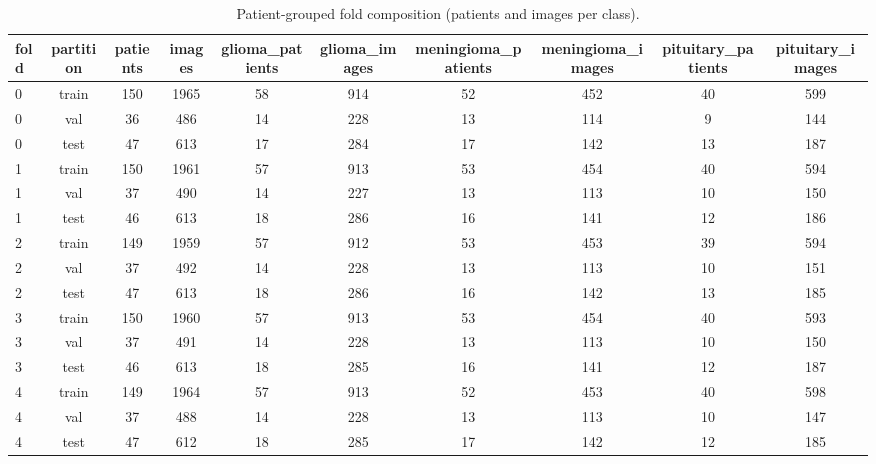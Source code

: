 \begin{table}[t]
\centering
\caption{Patient-grouped fold composition (patients and images per class).}
\label{tab:table1_split_composition}
\small
\begin{tabular}{lccccccccc}
\toprule
fold & partition & patients & images & glioma\_patients & glioma\_images & meningioma\_patients & meningioma\_images & pituitary\_patients & pituitary\_images \\
\midrule
0 & train & 150 & 1965 & 58 & 914 & 52 & 452 & 40 & 599 \\
0 & val & 36 & 486 & 14 & 228 & 13 & 114 & 9 & 144 \\
0 & test & 47 & 613 & 17 & 284 & 17 & 142 & 13 & 187 \\
1 & train & 150 & 1961 & 57 & 913 & 53 & 454 & 40 & 594 \\
1 & val & 37 & 490 & 14 & 227 & 13 & 113 & 10 & 150 \\
1 & test & 46 & 613 & 18 & 286 & 16 & 141 & 12 & 186 \\
2 & train & 149 & 1959 & 57 & 912 & 53 & 453 & 39 & 594 \\
2 & val & 37 & 492 & 14 & 228 & 13 & 113 & 10 & 151 \\
2 & test & 47 & 613 & 18 & 286 & 16 & 142 & 13 & 185 \\
3 & train & 150 & 1960 & 57 & 913 & 53 & 454 & 40 & 593 \\
3 & val & 37 & 491 & 14 & 228 & 13 & 113 & 10 & 150 \\
3 & test & 46 & 613 & 18 & 285 & 16 & 141 & 12 & 187 \\
4 & train & 149 & 1964 & 57 & 913 & 52 & 453 & 40 & 598 \\
4 & val & 37 & 488 & 14 & 228 & 13 & 113 & 10 & 147 \\
4 & test & 47 & 612 & 18 & 285 & 17 & 142 & 12 & 185 \\
\bottomrule
\end{tabular}
\end{table}
